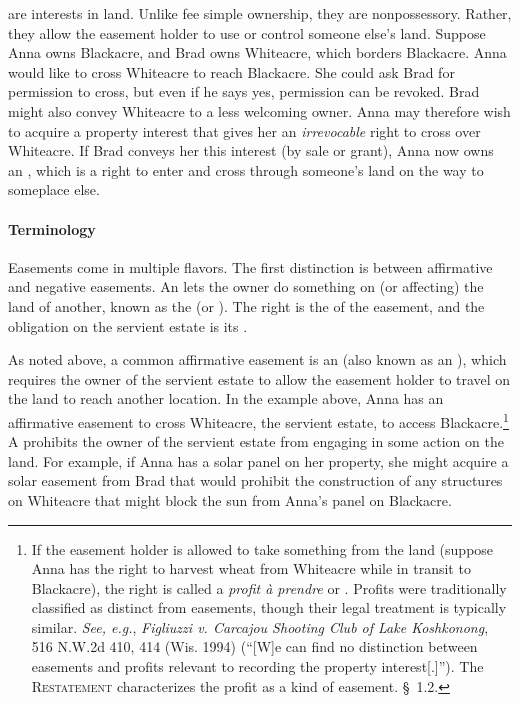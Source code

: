  are interests in land. Unlike fee simple ownership,
they are
nonpossessory. Rather, they allow the easement holder to use or control someone
else's land. Suppose Anna owns Blackacre, and Brad owns Whiteacre, which borders
Blackacre. Anna would like to cross Whiteacre to reach Blackacre. She could ask
Brad for permission to cross, but even if he says yes, permission can be
revoked. Brad might also convey Whiteacre to a less welcoming owner. Anna may
therefore wish to acquire a property interest that gives her an
\textit{irrevocable} right to cross over Whiteacre. If Brad conveys her this
interest (by sale or grant), Anna now owns an , which
is a right to enter and cross through someone's land on the way to someplace
else.

\paragraph{Terminology}
Easements come in multiple flavors. The first distinction is between affirmative
and negative easements. An  lets the owner do
something on (or affecting) the land of another, known as the  (or ). The right is the  of
the easement, and the obligation on the servient estate is its .


As noted above, a common affirmative easement is an 
(also known as an ), which requires the owner of the
servient estate to allow the easement holder to travel on the land to reach
another location. In the example above, Anna has an affirmative easement to
cross Whiteacre, the servient estate, to access Blackacre.\footnote{If the
easement holder is allowed to take something from the land (suppose Anna has the
right to harvest wheat from Whiteacre while in transit to Blackacre), the right
is called a \emph{profit \`a prendre} or . Profits were
traditionally classified as distinct from easements, though their legal
treatment is typically similar. \textit{See, e.g.}, \emph{Figliuzzi v. Carcajou
Shooting Club of Lake Koshkonong}, 516 N.W.2d 410, 414 (Wis. 1994) (``[W]e can
find no distinction between easements and profits relevant to recording the
property interest[.]''). The \textsc{Restatement} characterizes the profit as a
kind of easement. \S~1.2.} A  prohibits the owner of
the servient estate from engaging in some action on the land. For example, if
Anna has a solar panel on her property, she might acquire a solar easement from
Brad that would prohibit the construction of any structures on Whiteacre that
might block the sun from Anna's panel on Blackacre. 

